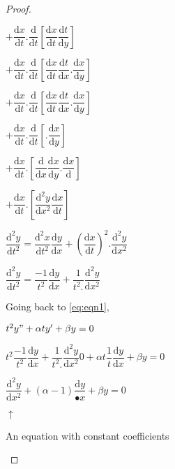 \documentclass{article}
\begin{document}
\begin{proof}
\begin{flushright}
$+  \dfrac{\mathrm{d}x}{\mathrm{d}t}  .  \dfrac{\mathrm{d}}{\mathrm{d}t}  [\dfrac{\mathrm{d}x}{\mathrm{d}t}  \dfrac{\mathrm{d}t}{\mathrm{d}y}]$

$+  \dfrac{\mathrm{d}x}{\mathrm{d}t}  .  \dfrac{\mathrm{d}}{\mathrm{d}t}  [\dfrac{\mathrm{d}x}{\mathrm{d}t}  \dfrac{\mathrm{d}t}{\mathrm{d}x} . \dfrac{\mathrm{d}x}{\mathrm{d}y}]$

$+  \dfrac{\mathrm{d}x}{\mathrm{d}t}  .  \dfrac{\mathrm{d}}{\mathrm{d}t}  [{\dfrac{{\mathrm{d}x}}{\mathrm{d}t}}  {\dfrac{\mathrm{d}t}{\mathrm{d}x}} . \dfrac{\mathrm{d}x}{\mathrm{d}y}]$

$+  \dfrac{\mathrm{d}x}{\mathrm{d}t}  .  \dfrac{\mathrm{d}}{\mathrm{d}t}  [ . \dfrac{\mathrm{d}x}{\mathrm{d}y}]$

$+  \dfrac{\mathrm{d}x}{\mathrm{d}t}  .  [\dfrac{\mathrm{d}}{\mathrm{d}x}  \dfrac{\mathrm{d}x}{\mathrm{d}y} . \dfrac{\mathrm{d}x}{\mathrm{d}} ]$

$+  \dfrac{\mathrm{d}x}{\mathrm{d}t}  .  [\dfrac{\mathrm{d^2}y}{\mathrm{d}x^2}  \dfrac{\mathrm{d}x}{\mathrm{d}t}]$

$\dfrac{\mathrm{d}^2y}{\mathrm{d}t^2} = \dfrac{\mathrm{d}^2x}{\mathrm{d}t^2} \dfrac{\mathrm{d}y}{\mathrm{d}x} + (\dfrac{\mathrm{d}x}{\mathrm{d}t})^2.\dfrac{\mathrm{d^2}y}{\mathrm{d}x^2}$

$\dfrac{\mathrm{d}^2y}{\mathrm{d}t^2} =
\dfrac{-1}{t^2} \dfrac{\mathrm{d}y}{\mathrm{d}x} + \dfrac{1}{t^2.} \dfrac{\mathrm{d^2}y}{\mathrm{d}x^2}$

Going back to \eqref{eq:eqn1},

\begin{center}
$t^2y" + \alpha ty' + \beta y = 0$

$t^2\dfrac{-1}{t^2} \dfrac{\mathrm{d}y}{\mathrm{d}x} + \dfrac{1}{t^2.} \dfrac{\mathrm{d^2}y}{\mathrm{d}x^2}0 + \alpha t\dfrac{1}{t}\dfrac{\mathrm{d}y}{\mathrm{d}x} + \beta y = 0$

$\dfrac{\mathrm{d^2}y}{\mathrm{d}x^2} + (\alpha -1)\dfrac{\mathrm{d}y}{\mathrm{•}x} + \beta y = 0$

$\uparrow$

An equation with constant coefficients
\end{center}

\end{flushright}

\end{proof}
\end{document}
